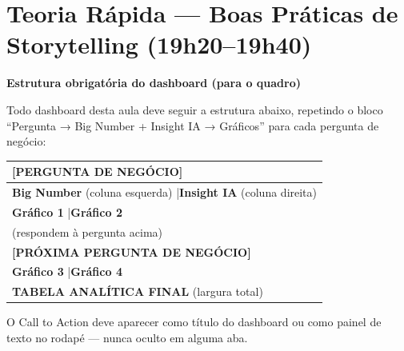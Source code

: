 \section{Teoria Rápida — Boas Práticas de Storytelling (19h20–19h40)}

\begin{BoardBox}
\textbf{Estrutura obrigatória do dashboard (para o quadro)}

Todo dashboard desta aula deve seguir a estrutura abaixo, repetindo o bloco
``Pergunta → Big Number + Insight IA → Gráficos'' para cada pergunta de negócio:

\medskip
\begin{tabular}{|p{13cm}|}
\hline
\textbf{[PERGUNTA DE NEGÓCIO]} \\
\hline
\textbf{Big Number} (coluna esquerda) \quad|\quad \textbf{Insight IA} (coluna direita) \\
\hline
\textbf{Gráfico 1} \quad|\quad \textbf{Gráfico 2} \\
(respondem à pergunta acima) \\
\hline
\textbf{[PRÓXIMA PERGUNTA DE NEGÓCIO]} \\
\hline
\textbf{Gráfico 3} \quad|\quad \textbf{Gráfico 4} \\
\hline
\textbf{TABELA ANALÍTICA FINAL} (largura total) \\
\hline
\end{tabular}

\medskip
O Call to Action deve aparecer como título do dashboard ou como painel de texto
no rodapé — nunca oculto em alguma aba.
\end{BoardBox}

